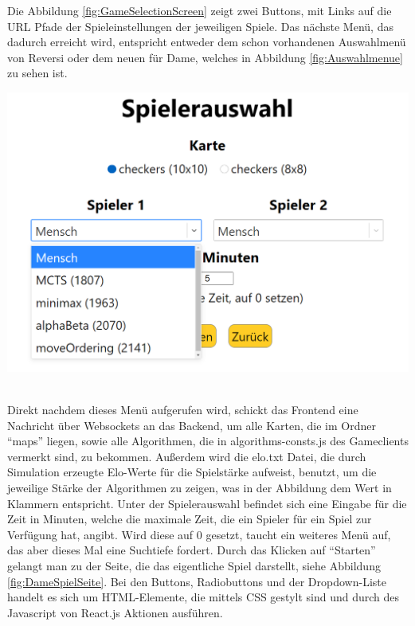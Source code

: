 \documentclass[12pt,a4paper,bibliography=totocnumbered,listof=totocnumbered]{article}
\begin{document}
Die Abbildung \ref{fig:GameSelectionScreen} zeigt zwei Buttons, mit Links auf die \ac{URL} Pfade der Spieleinstellungen der jeweiligen Spiele. 
Das nächste Menü, das dadurch erreicht wird,
entspricht entweder dem schon vorhandenen Auswahlmenü von Reversi oder dem neuen für Dame, welches in Abbildung \ref{fig:Auswahlmenue} zu sehen ist.

\vspace{1em}
\begin{minipage}{\linewidth}
	\centering
	\includegraphics[width=0.7\linewidth]{pics/AlgorithmeninderApplikation.png}
	\label{fig:Auswahlmenue}
\end{minipage}
\\

Direkt nachdem dieses Menü aufgerufen wird, schickt das Frontend eine Nachricht über Websockets an das Backend, um alle Karten, die im Ordner ``maps'' liegen, sowie 
alle Algorithmen, die in algorithms-consts.js des Gameclients vermerkt sind, zu bekommen. Außerdem wird die elo.txt Datei, die durch 
Simulation erzeugte Elo-Werte für die Spielstärke aufweist, benutzt, um die jeweilige Stärke der Algorithmen zu zeigen, was in der Abbildung 
dem Wert in Klammern entspricht. Unter der Spielerauswahl befindet sich eine Eingabe für die Zeit in Minuten, welche die maximale Zeit,
die ein Spieler für ein Spiel zur Verfügung hat, angibt. Wird diese auf 0 gesetzt, taucht ein weiteres Menü auf, das aber dieses Mal eine 
Suchtiefe fordert. Durch das Klicken auf ``Starten'' gelangt man zu der Seite, die das eigentliche Spiel darstellt, siehe Abbildung \ref{fig:DameSpielSeite}.
Bei den Buttons, Radiobuttons und der Dropdown-Liste handelt es sich um HTML-Elemente, die mittels CSS gestylt sind und durch 
des Javascript von React.js Aktionen ausführen.
\end{document}
